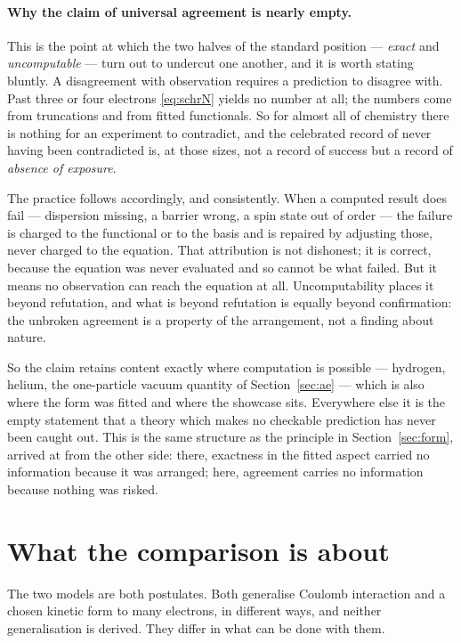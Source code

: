 \documentclass[11pt]{article}
\begin{document}
\paragraph{Why the claim of universal agreement is nearly empty.}
This is the point at which the two halves of the standard position --- \emph{exact} and
\emph{uncomputable} --- turn out to undercut one another, and it is worth stating bluntly. A
disagreement with observation requires a prediction to disagree with. Past three or four electrons
\eqref{eq:schrN} yields no number at all; the numbers come from truncations and from fitted
functionals. So for almost all of chemistry there is nothing for an experiment to contradict, and
the celebrated record of never having been contradicted is, at those sizes, not a record of success
but a record of \emph{absence of exposure}.

The practice follows accordingly, and consistently. When a computed result does fail --- dispersion
missing, a barrier wrong, a spin state out of order --- the failure is charged to the functional or
to the basis and is repaired by adjusting those, never charged to the equation. That attribution is
not dishonest; it is correct, because the equation was never evaluated and so cannot be what failed.
But it means no observation can reach the equation at all. Uncomputability places it beyond
refutation, and what is beyond refutation is equally beyond confirmation: the unbroken agreement is
a property of the arrangement, not a finding about nature.

So the claim retains content exactly where computation is possible --- hydrogen, helium, the
one-particle vacuum quantity of Section~\ref{sec:ae} --- which is also where the form was fitted
and where the showcase sits. Everywhere else it is the empty statement that a theory which makes no
checkable prediction has never been caught out. This is the same structure as the principle in
Section~\ref{sec:form}, arrived at from the other side: there, exactness in the fitted aspect
carried no information because it was arranged; here, agreement carries no information because
nothing was risked.


\section{What the comparison is about}\label{sec:conclusion}

The two models are both postulates. Both generalise Coulomb interaction and a chosen kinetic form
to many electrons, in different ways, and neither generalisation is derived. They differ in what
can be done with them.
\end{document}
